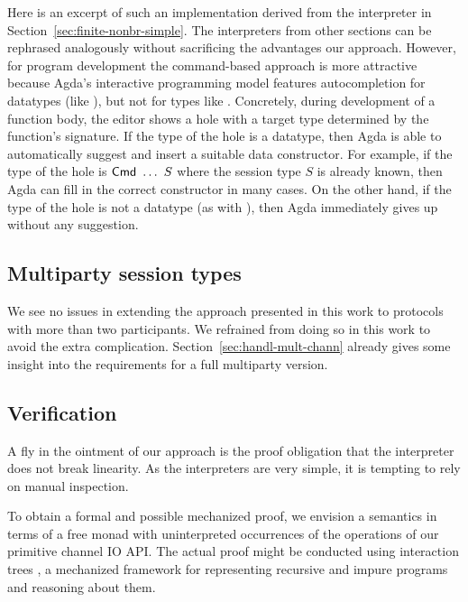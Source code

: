 \documentclass[acmsmall,screen]{acmart}
\begin{document}
Here is an excerpt of such an implementation derived from the
interpreter in Section~\ref{sec:finite-nonbr-simple}.
\stCombinators
The interpreters from other sections can be rephrased analogously
without sacrificing the advantages our approach. However, for program
development the command-based approach is more attractive because 
Agda's interactive programming model features autocompletion for
datatypes (like {\ACommand}), but not for types like {\AXCommand}.
Concretely, during development of a function body, the editor shows a
hole with a target type determined by the function's signature. If the
type of the hole is a datatype, then Agda is able to automatically
suggest and insert a suitable data constructor. For example, if the
type of the hole is {$\ACommand\ \dots\ S$} where the session type $S$
is already known, then Agda can fill in the correct constructor in
many cases. On the other hand, if the type of the hole is not a
datatype (as with {\AXCommand}), then Agda
immediately gives up without any suggestion. 

\subsection{Multiparty session types}
\label{sec:mult-sess-types}

We see no issues in extending the approach presented in this work to
protocols with more than two participants. We refrained from doing so
in this work to avoid the extra
complication. Section~\ref{sec:handl-mult-chann} already gives some
insight into the requirements for a full multiparty version.

\subsection{Verification}
\label{sec:verification}

A fly in the ointment of our approach is the proof obligation that
the interpreter does not break linearity. As the interpreters are very
simple, it is tempting to rely on manual inspection.

To obtain a formal and possible mechanized proof, we envision a
semantics in terms of a free monad
\cite{DBLP:journals/jfp/Swierstra08,DBLP:conf/haskell/KiselyovI15}
with uninterpreted occurrences of 
the operations of our primitive channel IO API. The actual proof might be
conducted using interaction trees
\cite{DBLP:journals/pacmpl/XiaZHHMPZ20}, a mechanized framework for
representing recursive and impure programs and  reasoning about them.
\end{document}
